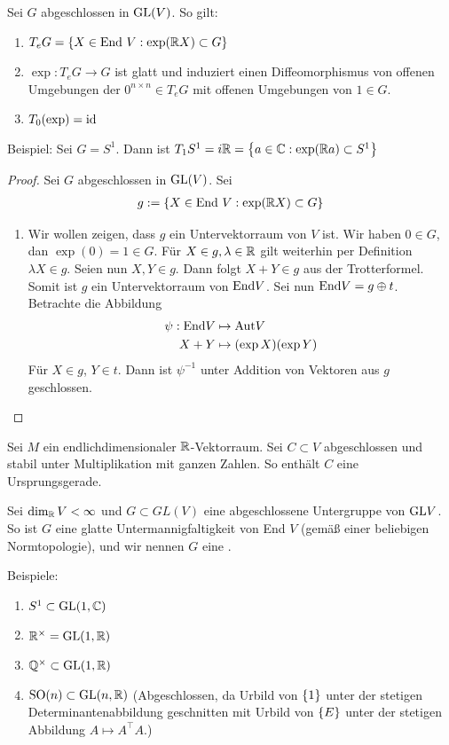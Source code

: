 \documentclass{report}
\begin{document}
\begin{theorem}
	Sei $G$ abgeschlossen in $\textnormal{GL}(V)$. So gilt:
	\begin{enumerate}
		\item $T_e G = \qty{X \in \textnormal{End}~ V : \exp(\mathbb{R}X) \subset G}$
		\item $\exp: T_e G \to G$ ist glatt und induziert einen Diffeomorphismus von offenen Umgebungen der $0^{n \times n} \in T_e G$ mit offenen Umgebungen von $1 \in G$.
		\item $T_0(\exp) = \textnormal{id}$
	\end{enumerate}
\end{theorem}
Beispiel: Sei $G = S^1$. Dann ist $T_1 S^1 = i\mathbb{R} = \qty{a \in \mathbb{C}: \exp(\mathbb{R}a) \subset S^1}$
\begin{proof}
	Sei $G$ abgeschlossen in $\textnormal{GL}(V)$. Sei
	\begin{align*}
		g := \qty{X \in \textnormal{End}~ V : \exp(\mathbb{R}X) \subset G}
	\end{align*}
	\begin{enumerate}
		\item Wir wollen zeigen, dass $g$ ein Untervektorraum von $V$ ist. Wir haben $0 \in G$, dan $\exp(0) = 1 \in G$. Für $X \in g, \lambda \in \mathbb{R}$ gilt weiterhin per Definition $\lambda X \in g$.
		Seien nun $X,Y \in g$. Dann folgt $X + Y \in g$ aus der Trotterformel.
		Somit ist $g$ ein Untervektorraum von $\textnormal{End} V$.
		Sei nun $\textnormal{End} V = g \oplus t$. Betrachte die Abbildung 
		\begin{align*}
			\psi : \textnormal{End} V &\mapsto \textnormal{Aut} V\\
			X + Y &\mapsto (\exp X)(\exp Y)
		\end{align*}
		Für $X \in g$, $Y \in t$. Dann ist $\psi^{-1}$ unter Addition von Vektoren aus $g$ geschlossen.
	\end{enumerate}
\end{proof}
\begin{lemma}
	Sei $M$ ein endlichdimensionaler $\mathbb{R}$-Vektorraum. Sei $C \subset V$ abgeschlossen und stabil unter Multiplikation mit ganzen Zahlen. So enthält $C$ eine Ursprungsgerade.
\end{lemma}
\begin{corollary}
	Sei $\dim_{\mathbb{R}} V < \infty$ und $G \subset GL(V)$ eine abgeschlossene Untergruppe von $\textnormal{GL} V$. So ist $G$ eine glatte Untermannigfaltigkeit von End $V$ (gemäß einer beliebigen Normtopologie), und wir nennen $G$ eine .
\end{corollary}
Beispiele:
\begin{enumerate}
	\item $S^1 \subset \textnormal{GL}(1,\mathbb{C})$
	\item $\mathbb{R}^\times = \textnormal{GL}(1, \mathbb{R})$
	\item $\mathbb{Q}^\times \subset \textnormal{GL}(1, \mathbb{R})$
	\item $\textnormal{SO}(n) \subset \textnormal{GL}(n, \mathbb{R})$ (Abgeschlossen, da Urbild von $\qty{1}$ unter der stetigen Determinantenabbildung geschnitten mit Urbild von $\qty{E}$ unter der stetigen Abbildung $A \mapsto A^\top A$.)
\end{enumerate}
\end{document}
